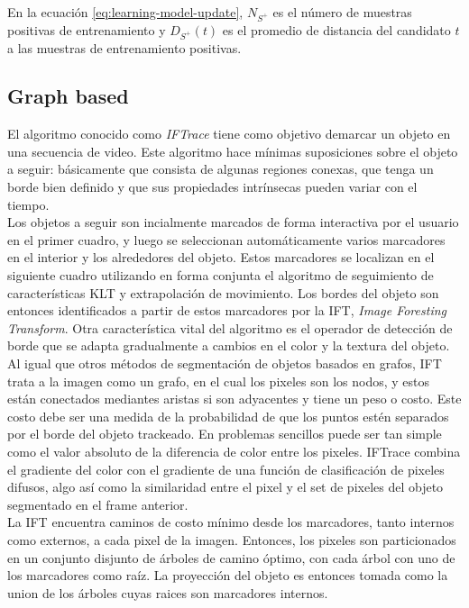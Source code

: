 \documentclass[a4paper,10pt]{article}
\begin{document}
En la ecuación \ref{eq:learning-model-update}, $N_{S^{+}}$ es el 
número de muestras positivas de entrenamiento y $D_{S^{+}}(t)$
es el promedio de distancia del candidato $t$ a las muestras
de entrenamiento positivas.

\subsection{Graph based}

El algoritmo conocido como \textit{IFTrace} tiene como objetivo demarcar un objeto en una secuencia de video. Este algoritmo hace mínimas
suposiciones sobre el objeto a seguir: básicamente que consista de algunas regiones conexas, que tenga un borde bien definido y que sus propiedades
intrínsecas pueden variar con el tiempo.\\
Los objetos a seguir son incialmente marcados de forma interactiva por el usuario en el primer cuadro, y luego se seleccionan automáticamente
varios marcadores en el interior y los alrededores del objeto. Estos marcadores se localizan en el siguiente cuadro utilizando en forma
conjunta el algoritmo de
seguimiento de características KLT \cite{KLT} y extrapolación de movimiento. Los bordes del objeto son entonces identificados a partir de estos marcadores por la IFT, 
\textit{Image Foresting Transform}\cite{IFT}. Otra característica vital del algoritmo es el operador de detección de borde que se adapta gradualmente a cambios en el 
color y la textura del objeto. \\

Al igual que otros métodos de segmentación de objetos basados en grafos, IFT trata a la imagen como un grafo, en el cual los pixeles son los nodos, y
estos están conectados mediantes aristas si son adyacentes y tiene un peso o costo. Este costo debe ser una medida de la probabilidad de que 
los puntos estén separados por el borde del objeto trackeado. En problemas sencillos puede ser tan simple como el valor absoluto de la diferencia de color 
entre los pixeles. IFTrace combina el gradiente del color con el gradiente de una función de clasificación de pixeles difusos, algo así como la similaridad entre el pixel 
y el set de pixeles del objeto segmentado en el frame anterior. \\

La IFT encuentra caminos de costo mínimo desde los marcadores, tanto internos como externos, a cada pixel de la imagen. Entonces, los pixeles son particionados en un conjunto
disjunto de árboles de camino óptimo, con cada árbol con uno de los marcadores como raíz. La proyección del objeto es entonces tomada como la union de los árboles cuyas raices 
son marcadores internos.\\
\end{document}

